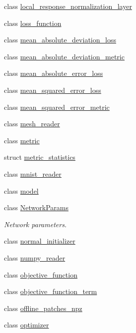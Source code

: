\begin{DoxyCompactItemize}
class \hyperlink{classlbann_1_1local__response__normalization__layer}{local\+\_\+response\+\_\+normalization\+\_\+layer}
\item 
class \hyperlink{classlbann_1_1loss__function}{loss\+\_\+function}
\item 
class \hyperlink{classlbann_1_1mean__absolute__deviation__loss}{mean\+\_\+absolute\+\_\+deviation\+\_\+loss}
\item 
class \hyperlink{classlbann_1_1mean__absolute__deviation__metric}{mean\+\_\+absolute\+\_\+deviation\+\_\+metric}
\item 
class \hyperlink{classlbann_1_1mean__absolute__error__loss}{mean\+\_\+absolute\+\_\+error\+\_\+loss}
\item 
class \hyperlink{classlbann_1_1mean__squared__error__loss}{mean\+\_\+squared\+\_\+error\+\_\+loss}
\item 
class \hyperlink{classlbann_1_1mean__squared__error__metric}{mean\+\_\+squared\+\_\+error\+\_\+metric}
\item 
class \hyperlink{classlbann_1_1mesh__reader}{mesh\+\_\+reader}
\item 
class \hyperlink{classlbann_1_1metric}{metric}
\item 
struct \hyperlink{structlbann_1_1metric__statistics}{metric\+\_\+statistics}
\item 
class \hyperlink{classlbann_1_1mnist__reader}{mnist\+\_\+reader}
\item 
class \hyperlink{classlbann_1_1model}{model}
\item 
class \hyperlink{classlbann_1_1NetworkParams}{Network\+Params}
\begin{DoxyCompactList}\small\item\em Network parameters. \end{DoxyCompactList}\item 
class \hyperlink{classlbann_1_1normal__initializer}{normal\+\_\+initializer}
\item 
class \hyperlink{classlbann_1_1numpy__reader}{numpy\+\_\+reader}
\item 
class \hyperlink{classlbann_1_1objective__function}{objective\+\_\+function}
\item 
class \hyperlink{classlbann_1_1objective__function__term}{objective\+\_\+function\+\_\+term}
\item 
class \hyperlink{classlbann_1_1offline__patches__npz}{offline\+\_\+patches\+\_\+npz}
\item 
class \hyperlink{classlbann_1_1optimizer}{optimizer}
\item 

\end{DoxyCompactItemize}
